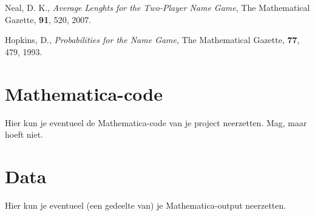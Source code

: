 \documentclass{uvamath}
\begin{document}
\begin{thebibliography}{x}

  Neal, D. K.,
  \emph{Average Lenghts for the Two-Player Name Game},
  The Mathematical Gazette, \textbf{91}, 520,
  2007.

  Hopkins, D.,
  \emph{Probabilities for the Name Game},
  The Mathematical Gazette, \textbf{77}, 479,
  1993.

\end{thebibliography}

\appendix

\chapter{Mathematica-code}
Hier kun je eventueel de Mathematica-code van je project neerzetten. Mag, maar hoeft niet. 

\chapter{Data}
Hier kun je eventueel (een gedeelte van) je Mathematica-output neerzetten. 
\end{document}
